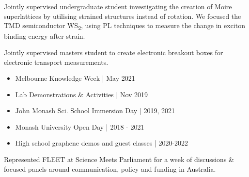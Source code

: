 \documentclass[10pt,a4paper,ragged2e,withhyper]{altacv}
\begin{document}
			\divider
				
			
				Jointly supervised undergraduate student investigating the creation of Moire superlattices by utilising strained structures instead of rotation. We focused the TMD semiconductor WS\textsubscript{2}, using PL techniques to measure the change in exciton binding energy after strain.
			
				\divider
				
				Jointly supervised masters student to create electronic breakout boxes for electronic transport measurements.
				
			\divider

			\vspace{-1em}
			\begin{multicols}{2}
			\begin{itemize}
				\item Melbourne Knowledge Week | May 2021
				\item Lab Demonstrations \& Activities | Nov 2019
				\item John Monash Sci. School Immersion Day | 2019, 2021
				\item Monash University Open Day | 2018 - 2021
				\item High school graphene demos and guest classes | 2020-2022
			\end{itemize}
			\end{multicols}
			
		

		\vspace{-1em}
		
		Represented FLEET at Science Meets Parliament for a week of discussions \& focused panels around communication, policy and funding in Australia.
		
		\divider
		
\end{document}
